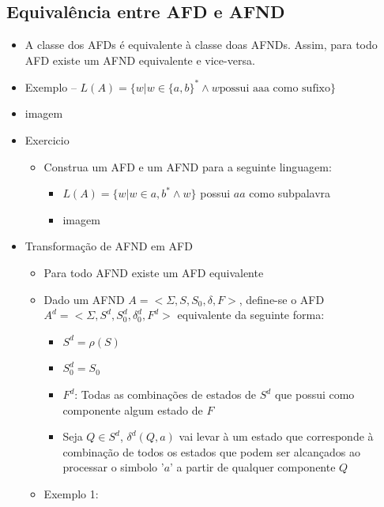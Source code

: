 \documentclass[12pt]{article}
\begin{document}
    \subsection{Equivalência entre AFD e AFND}
    \begin{itemize}
        \item A classe dos AFDs é equivalente à classe doas AFNDs. Assim, para 
        todo AFD existe um AFND equivalente e vice-versa.
        \item Exemplo -- $L(A)=\{ w|w\in \{a,b\}^* \wedge w \text{possui aaa 
        como sufixo} \}$
        \item[] imagem
        \item Exercicio
        \begin{itemize}
            \item Construa um AFD e um AFND para a seguinte linguagem:
            \begin{itemize}
                \item \( L(A)=\{w|w \in {a,b}^* \wedge w\} \) possui $aa$ como 
                subpalavra
                \item[] imagem 
            \end{itemize}
        \end{itemize}
        \item Transformação de AFND em AFD
        \begin{itemize}
            \item Para todo AFND existe um AFD equivalente
            \item Dado um AFND $A = <\Sigma, S, S_0, \delta, F>$, define-se 
            o AFD $A^d = <\Sigma, S^d, S^d_0, \delta^d_0, F^d>$ equivalente da 
            seguinte forma:
            \begin{itemize}
                \item $S^d = \rho(S)$
                \item $S^d_0=S_0$
                \item $F^d$: Todas as combinações de estados de $S^d$ que possui 
                como componente algum estado de $F$
                \item Seja $Q\in S^d$, $\delta^d(Q,a)$ vai levar à um estado 
                que corresponde à combinação de todos os estados que podem ser 
                alcançados ao processar o simbolo '$a$' a partir de qualquer 
                componente $Q$
            \end{itemize}
            \item Exemplo 1:

\end{itemize}
\end{itemize}
\end{document}
